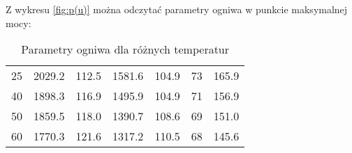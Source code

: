\documentclass[a4, 12pt]{article}
\begin{document}
	Z wykresu \ref{fig:p(u)} można odczytać parametry ogniwa w punkcie maksymalnej mocy:
	\begin{table}[h]
		\centering
		\begin{tabular}{
			S[table-column-width=2.0cm]
			S[table-column-width=1.5cm]
			S[table-column-width=1.5cm]
			S[table-column-width=1.5cm]
			S[table-column-width=1.5cm]
			S[table-column-width=1.5cm]
			S[table-column-width=1.5cm]}
			\toprule
			{} & 
			{} & 
			{} & 
			{} & 
			{} & 
			{} & 
			{} \\
			\midrule
			25 & 2029.2 & 112.5 & 1581.6 & 104.9 & 73 & 165.9 \\
			40 & 1898.3 & 116.9 & 1495.9 & 104.9 & 71 & 156.9 \\
			50 & 1859.5 & 118.0 & 1390.7 & 108.6 & 69 & 151.0 \\
			60 & 1770.3 & 121.6 & 1317.2 & 110.5 & 68 & 145.6 \\
			\bottomrule
		\end{tabular}
		\caption{Parametry ogniwa dla różnych temperatur}
	\end{table}
	
\end{document}
